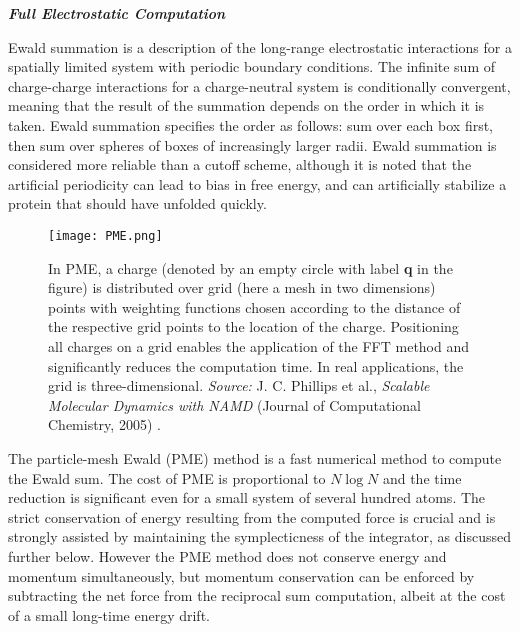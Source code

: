 \begin{center}
{\textbf{\textit{Full Electrostatic Computation}}}
\end{center}
Ewald summation is a description of the long-range electrostatic interactions for a spatially limited system with periodic boundary conditions. The infinite sum of charge-charge interactions for a charge-neutral system is conditionally convergent, meaning that the result of the summation depends on the order in which it is taken. Ewald summation specifies the order as follows: sum over each box first, then sum over spheres of boxes of increasingly larger radii. Ewald summation is considered more reliable than a cutoff scheme, although it is noted that the artificial periodicity can lead to bias in free energy, and can artificially stabilize a protein that should have unfolded quickly.
\begin{figure}[H]
\centering
\begin{minipage}[t]{0.775\textwidth}
	\centering
    \texttt{[image: PME.png]}
    
    \footnotesize{\caption{In PME, a charge (denoted by an empty circle with label \textbf{q} in the figure) is distributed over grid (here a mesh in two dimensions) points with weighting functions chosen according to the distance of the respective grid points to the location of the charge. Positioning all charges on a grid enables the application of the FFT method and significantly reduces the computation time. In real applications, the grid is three-dimensional.
    \textit{Source:} J. C. Phillips et al., \textit{Scalable Molecular Dynamics with NAMD} (Journal of Computational Chemistry, 2005) 
    \cite{ref:NAMD}.}
    \label{fig:PME}
    }
\end{minipage} 
\end{figure}

The particle-mesh Ewald (PME) method is a fast numerical method to compute the Ewald sum. The cost of PME is proportional to $N \log N$ and the time reduction is significant even for a small system of several hundred atoms. 
The strict conservation of energy resulting from the computed force is crucial and is strongly assisted by maintaining the symplecticness of the integrator, as discussed further below.
However the PME method does not conserve energy and momentum simultaneously, but momentum conservation can be enforced by subtracting the net force from the reciprocal sum computation, albeit at the cost of a small long-time energy drift.

